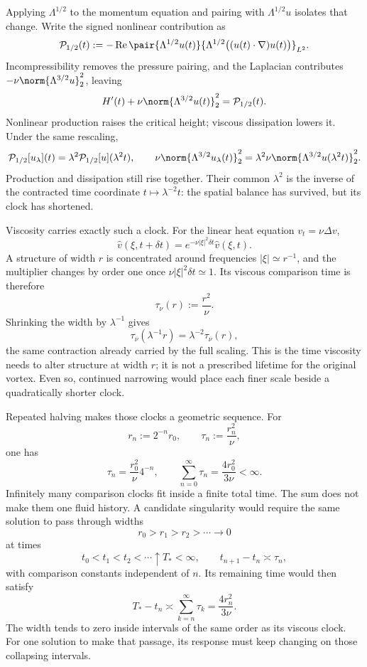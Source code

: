 Applying \(\Lambda^{1/2}\) to the momentum equation and pairing with \(\Lambda^{1/2}u\) isolates that change.
Write the signed nonlinear contribution as
\[
  \mathcal P_{1/2}(t)
  :=
  -\operatorname{Re}
  \pair
    {\Lambda^{1/2}u(t)}
    {\Lambda^{1/2}\bigl((u(t)\cdot\nabla)u(t)\bigr)}_{L^2}.
\]
Incompressibility removes the pressure pairing, and the Laplacian contributes \(-\nu\norm{\Lambda^{3/2}u}_2^2\), leaving
\[
  H'(t)
  +
  \nu\norm{\Lambda^{3/2}u(t)}_2^2
  =
  \mathcal P_{1/2}(t).
\]
Nonlinear production raises the critical height; viscous dissipation lowers it.
Under the same rescaling,
\[
  \mathcal P_{1/2}[u_\lambda](t)
  =
  \lambda^2\mathcal P_{1/2}[u](\lambda^2t),
  \qquad
  \nu\norm{\Lambda^{3/2}u_\lambda(t)}_2^2
  =
  \lambda^2\nu\norm{\Lambda^{3/2}u(\lambda^2t)}_2^2.
\]
Production and dissipation still rise together.
Their common \(\lambda^2\) is the inverse of the contracted time coordinate \(t\mapsto\lambda^{-2}t\): the spatial balance has survived, but its clock has shortened.


Viscosity carries exactly such a clock.
For the linear heat equation \(v_t=\nu\Delta v\),
\[
  \widehat v(\xi,t+\delta t)
  =
  e^{-\nu|\xi|^2\delta t}\widehat v(\xi,t).
\]
A structure of width \(r\) is concentrated around frequencies \(|\xi|\simeq r^{-1}\), and the multiplier changes by order one once \(\nu|\xi|^2\delta t\simeq1\).
Its viscous comparison time is therefore
\[
  \tau_\nu(r)
  :=
  \frac{r^2}{\nu}.
\]
Shrinking the width by \(\lambda^{-1}\) gives
\[
  \tau_\nu(\lambda^{-1}r)
  =
  \lambda^{-2}\tau_\nu(r),
\]
the same contraction already carried by the full \NavierStokes{} scaling.
This is the time viscosity needs to alter structure at width \(r\); it is not a prescribed lifetime for the original vortex.
Even so, continued narrowing would place each finer scale beside a quadratically shorter clock.


Repeated halving makes those clocks a geometric sequence.
For
\[
  r_n:=2^{-n}r_0,
  \qquad
  \tau_n:=\frac{r_n^2}{\nu},
\]
one has
\[
  \tau_n
  =
  \frac{r_0^2}{\nu}4^{-n},
  \qquad
  \sum_{n=0}^{\infty}\tau_n
  =
  \frac{4r_0^2}{3\nu}
  <
  \infty.
\]
Infinitely many comparison clocks fit inside a finite total time.
The sum does not make them one fluid history.
A candidate singularity would require the same solution to pass through widths
\[
  r_0>r_1>r_2>\cdots\longrightarrow0
\]
at times
\[
  t_0<t_1<t_2<\cdots\uparrow T_*<\infty,
  \qquad
  t_{n+1}-t_n\asymp\tau_n,
\]
with comparison constants independent of \(n\).
Its remaining time would then satisfy
\[
  T_*-t_n
  \asymp
  \sum_{k=n}^{\infty}\tau_k
  =
  \frac{4r_n^2}{3\nu}.
\]
The width tends to zero inside intervals of the same order as its viscous clock.
For one solution to make that passage, its response must keep changing on those collapsing intervals.

